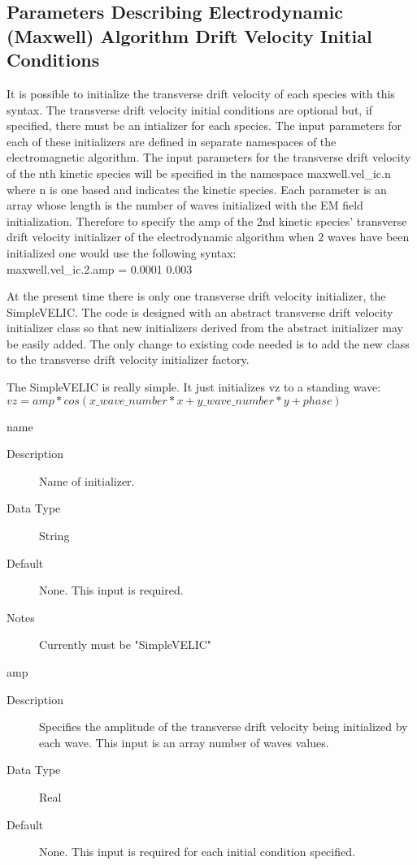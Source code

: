 \documentclass[11pt]{amsart}
\begin{document}
\subsection*{Parameters Describing Electrodynamic (Maxwell) Algorithm Drift Velocity Initial Conditions}
It is possible to initialize the transverse drift velocity of each species with
this syntax.  The transverse drift velocity initial conditions are optional but,
if specified, there must be an intializer for each species.  The input
parameters for each of these initializers are defined in separate namespaces of
the electromagnetic algorithm.  The input parameters for the transverse drift
velocity of the nth kinetic species will be specified in the namespace
maxwell.vel\_ic.n where n is one based and indicates the kinetic species.  Each
parameter is an array whose length is the number of waves initialized with the
EM field initialization.  Therefore to specify the amp of the 2nd kinetic
species' transverse drift velocity initializer of the electrodynamic algorithm
when 2 waves have been initialized one would use the following syntax: \\
maxwell.vel\_ic.2.amp = 0.0001 0.003

At the present time there is only one transverse drift velocity initializer,
the SimpleVELIC.  The code is designed with an abstract transverse drift
velocity initializer class so that new initializers derived from the abstract
initializer may be easily added.  The only change to existing code needed is
to add the new class to the transverse drift velocity initializer factory.

The SimpleVELIC is really simple.  It just initializes vz to a standing wave: \\
\begin{math} vz = amp*cos(x\_wave\_number*x+y\_wave\_number*y+phase) \end{math}

name
\begin{description}
\item [Description] Name of initializer.
\item [Data Type] String
\item [Default] None.  This input is required.
\item [Notes] Currently must be "SimpleVELIC"
\end{description}

amp
\begin{description}
\item [Description] Specifies the amplitude of the transverse drift velocity
being initialized by each wave.  This input is an array number of waves values.
\item [Data Type] Real
\item [Default] None.  This input is required for each initial condition
specified.
\end{description}
\end{document}
